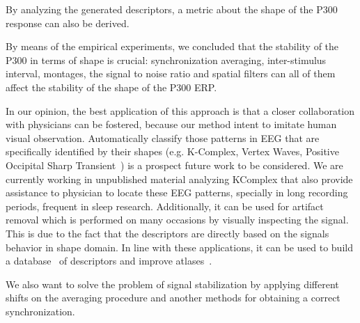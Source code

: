 \documentclass[entropy,article,submit,moreauthors,pdftex,10pt,a4paper]{mdpi}
\begin{document}
By analyzing the generated descriptors, a metric about the shape of the P300 response can also be derived.  

By means of the empirical experiments, we concluded that the stability of the P300 in terms of shape is crucial: synchronization averaging,  inter-stimulus interval,  montages, the signal to noise ratio and spatial filters can all of them affect the stability of the shape of the P300 ERP. 

In our opinion, the best application of this approach is that a closer collaboration with physicians can be fostered, because our method intent to imitate human visual observation.
Automatically classify those patterns in EEG that are specifically identified by their shapes (e.g. K-Complex, Vertex Waves, Positive Occipital Sharp Transient~\citep{Hartman2005}) is a prospect future work to be considered. We are currently working in unpublished material analyzing KComplex that also provide  assistance to physician to locate these EEG patterns, specially in long recording periods, frequent in sleep research.  
Additionally, it can be used for artifact removal which is performed on many occasions by visually inspecting the signal.  This is due to the fact that the descriptors are directly based on the signals behavior in shape domain.  In line with these applications,  it can be used to build a database~\citep{Chavarriaga2017} of descriptors and improve atlases~\citep{Hartman2005}.

We also want to solve the problem of signal stabilization by applying different shifts on the averaging procedure and another methods for obtaining a correct synchronization.  


\end{document}
